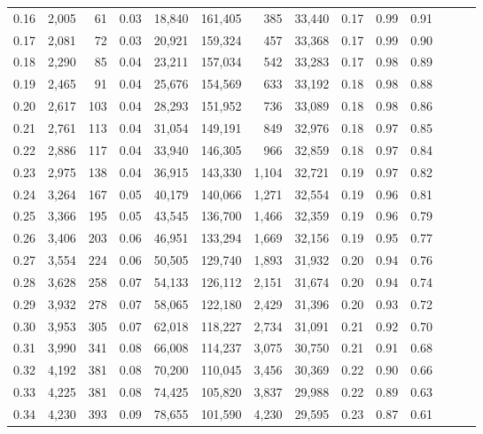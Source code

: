 \begin{tabular}{rrrrrrrrrrrrrr}
0.16 &  2,005 &   61 &  0.03 &   18,840 &  161,405 &     385 &  33,440 &  0.17 &  0.99 &      0.91 \\
0.17 &  2,081 &   72 &  0.03 &   20,921 &  159,324 &     457 &  33,368 &  0.17 &  0.99 &      0.90 \\
0.18 &  2,290 &   85 &  0.04 &   23,211 &  157,034 &     542 &  33,283 &  0.17 &  0.98 &      0.89 \\
0.19 &  2,465 &   91 &  0.04 &   25,676 &  154,569 &     633 &  33,192 &  0.18 &  0.98 &      0.88 \\
0.20 &  2,617 &  103 &  0.04 &   28,293 &  151,952 &     736 &  33,089 &  0.18 &  0.98 &      0.86 \\
0.21 &  2,761 &  113 &  0.04 &   31,054 &  149,191 &     849 &  32,976 &  0.18 &  0.97 &      0.85 \\
0.22 &  2,886 &  117 &  0.04 &   33,940 &  146,305 &     966 &  32,859 &  0.18 &  0.97 &      0.84 \\
0.23 &  2,975 &  138 &  0.04 &   36,915 &  143,330 &   1,104 &  32,721 &  0.19 &  0.97 &      0.82 \\
0.24 &  3,264 &  167 &  0.05 &   40,179 &  140,066 &   1,271 &  32,554 &  0.19 &  0.96 &      0.81 \\
0.25 &  3,366 &  195 &  0.05 &   43,545 &  136,700 &   1,466 &  32,359 &  0.19 &  0.96 &      0.79 \\
0.26 &  3,406 &  203 &  0.06 &   46,951 &  133,294 &   1,669 &  32,156 &  0.19 &  0.95 &      0.77 \\
0.27 &  3,554 &  224 &  0.06 &   50,505 &  129,740 &   1,893 &  31,932 &  0.20 &  0.94 &      0.76 \\
0.28 &  3,628 &  258 &  0.07 &   54,133 &  126,112 &   2,151 &  31,674 &  0.20 &  0.94 &      0.74 \\
0.29 &  3,932 &  278 &  0.07 &   58,065 &  122,180 &   2,429 &  31,396 &  0.20 &  0.93 &      0.72 \\
0.30 &  3,953 &  305 &  0.07 &   62,018 &  118,227 &   2,734 &  31,091 &  0.21 &  0.92 &      0.70 \\
0.31 &  3,990 &  341 &  0.08 &   66,008 &  114,237 &   3,075 &  30,750 &  0.21 &  0.91 &      0.68 \\
0.32 &  4,192 &  381 &  0.08 &   70,200 &  110,045 &   3,456 &  30,369 &  0.22 &  0.90 &      0.66 \\
0.33 &  4,225 &  381 &  0.08 &   74,425 &  105,820 &   3,837 &  29,988 &  0.22 &  0.89 &      0.63 \\
0.34 &  4,230 &  393 &  0.09 &   78,655 &  101,590 &   4,230 &  29,595 &  0.23 &  0.87 &      0.61 \\

\end{tabular}
